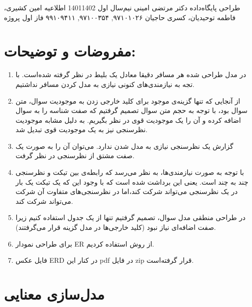 \documentclass[a4paper,12pt]{article}
\begin{document}
\handout
{طراحی پایگاه‌داده}
{دکتر مرتضی امینی}
{نیم‌سال اول 1401\lr{-}1402}
{اطلاعیه}
{امین کشیری، فاطمه توحیدیان، کسری حاجیان}
{۹۷۱۰۱۰۲۶, ۹۷۱۰۰۳۵۴, ۹۹۱۰۹۴۱۱}
 {فاز اول پروژه}


\section*{مفروضات و توضیحات: }
\begin{enumerate}
	\item در مدل طراحی شده هر مسافر دقیقا معادل یک بلیط در نظر گرفته شده‌است. با تجه به نیازمندی‌های 
	کنونی نیازی به مدل کردن مسافر نداشتیم. 
	\item از آنجایی که تنها گزینه‌ی موجود برای کلید خارجی زدن به موجودیت سوال، متن سوال بود، با توجه به حجم متن سوال تصمیم گرفتیم که صفت شناسه را به سوال اضافه کرده و آن را یک موجودیت قوی در نظر بگیریم. به دلیل مشابه موجودیت نظرسنجی نیز به یک موجودیت قوی تبدیل شد.
	\item گزارش یک نظرسنجی نیازی به مدل شدن ندارد. می‌توان آن  را به صورت یک صفت مشتق از 
	نظرسنجی در نظر گرفت. 
	\item با توجه به صورت نیازمندی‌ها، به نظر می‌رسد که 
	رابطه‌ی بین تیکت و نظرسنجی چند به چند است. یعنی این برداشت شده است که 
	با وجود این که یک تیکت یک بار در یک نظرسنجی می‌تواند شرکت کند،‌اما در نظرسنجی‌های 
	متفاوت آن شرکت می‌تواند شرکت کند. 
	\item در طراحی منطقی مدل سوال، تصمیم گرفتیم تنها از یک جدول استفاده کنیم 
	زیرا صفت اضافه‌ای نیاز نبود (کلید خارجی‌ها در مدل گزینه قرار می‌گرفتند).
	\item برای طراحی نمودار
	ER
	از روش 
	استفاده کردیم. 
	\item 
	فایل عکس 
	ERD 
	در کنار این 
	pdf 
	در فایل zip قرار گرفته‌است. 
\end{enumerate}


\section*{مدل‌سازی معنایی}
\end{document}

